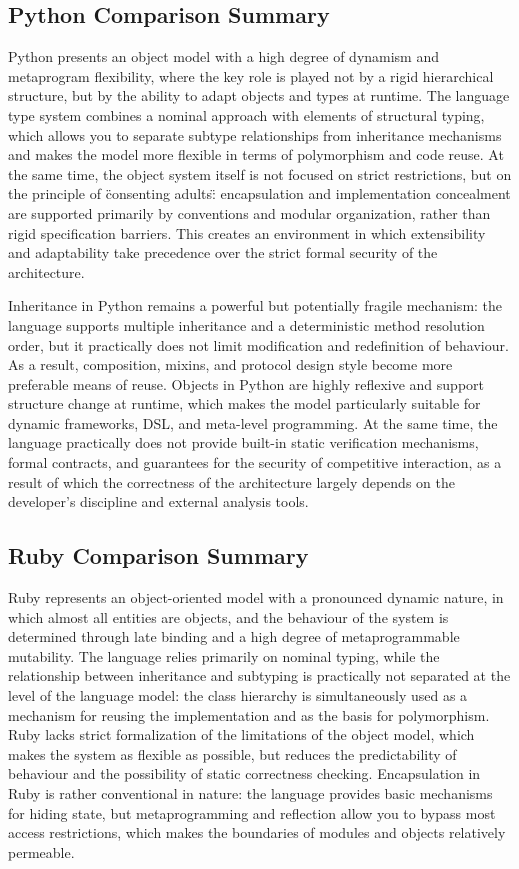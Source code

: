 \subsection{Python Comparison Summary}

Python presents an object model with a high degree of dynamism and metaprogram flexibility, where the key role is played not by a rigid hierarchical structure, but by the ability to adapt objects and types at runtime. The language type system combines a nominal approach with elements of structural typing, which allows you to separate subtype relationships from inheritance mechanisms and makes the model more flexible in terms of polymorphism and code reuse. At the same time, the object system itself is not focused on strict restrictions, but on the principle of \"consenting adults\": encapsulation and implementation concealment are supported primarily by conventions and modular organization, rather than rigid specification barriers. This creates an environment in which extensibility and adaptability take precedence over the strict formal security of the architecture.

Inheritance in Python remains a powerful but potentially fragile mechanism: the language supports multiple inheritance and a deterministic method resolution order, but it practically does not limit modification and redefinition of behaviour. As a result, composition, mixins, and protocol design style become more preferable means of reuse. Objects in Python are highly reflexive and support structure change at runtime, which makes the model particularly suitable for dynamic frameworks, DSL, and meta-level programming. At the same time, the language practically does not provide built-in static verification mechanisms, formal contracts, and guarantees for the security of competitive interaction, as a result of which the correctness of the architecture largely depends on the developer's discipline and external analysis tools.

\subsection{Ruby Comparison Summary}

Ruby represents an object-oriented model with a pronounced dynamic nature, in which almost all entities are objects, and the behaviour of the system is determined through late binding and a high degree of metaprogrammable mutability. The language relies primarily on nominal typing, while the relationship between inheritance and subtyping is practically not separated at the level of the language model: the class hierarchy is simultaneously used as a mechanism for reusing the implementation and as the basis for polymorphism. Ruby lacks strict formalization of the limitations of the object model, which makes the system as flexible as possible, but reduces the predictability of behaviour and the possibility of static correctness checking. Encapsulation in Ruby is rather conventional in nature: the language provides basic mechanisms for hiding state, but metaprogramming and reflection allow you to bypass most access restrictions, which makes the boundaries of modules and objects relatively permeable.

